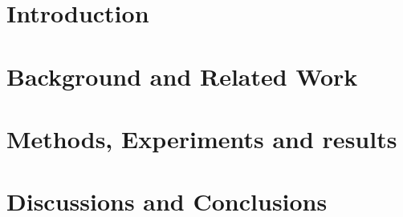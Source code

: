 \documentclass[harvard,bibliography=totoc]{lincolncsthesis}
\begin{document}

\maketitle







\thesisTables
\thesisBodyStart



\chapter{Introduction}


\chapter{Background and Related Work}


% 

% 

\chapter{Methods, Experiments and results}


\chapter{Discussions and Conclusions}

\end{document}
